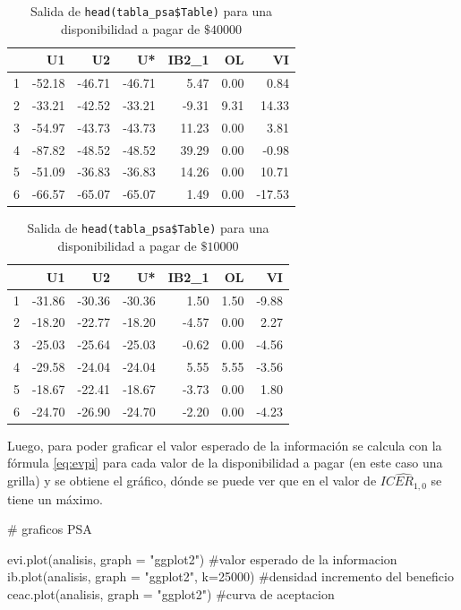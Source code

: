 \documentclass[12pt]{article}
\begin{document}
\begin{table}[ht]
\centering
\begin{tabular}{rrrrrrr}
  \hline
 & U1 & U2 & U* & IB2\_1 & OL & VI \\ 
  \hline
1 & -52.18 & -46.71 & -46.71 & 5.47 & 0.00 & 0.84 \\ 
  2 & -33.21 & -42.52 & -33.21 & -9.31 & 9.31 & 14.33 \\ 
  3 & -54.97 & -43.73 & -43.73 & 11.23 & 0.00 & 3.81 \\ 
  4 & -87.82 & -48.52 & -48.52 & 39.29 & 0.00 & -0.98 \\ 
  5 & -51.09 & -36.83 & -36.83 & 14.26 & 0.00 & 10.71 \\ 
  6 & -66.57 & -65.07 & -65.07 & 1.49 & 0.00 & -17.53 \\ 
   \hline
\end{tabular}
\caption{Salida de \texttt{head(tabla\_psa\$Table)} para una disponibilidad a pagar de $\$40000$}
\end{table}

\begin{table}[ht]
\centering
\begin{tabular}{rrrrrrr}
  \hline
 & U1 & U2 & U* & IB2\_1 & OL & VI \\ 
  \hline
1 & -31.86 & -30.36 & -30.36 & 1.50 & 1.50 & -9.88 \\ 
  2 & -18.20 & -22.77 & -18.20 & -4.57 & 0.00 & 2.27 \\ 
  3 & -25.03 & -25.64 & -25.03 & -0.62 & 0.00 & -4.56 \\ 
  4 & -29.58 & -24.04 & -24.04 & 5.55 & 5.55 & -3.56 \\ 
  5 & -18.67 & -22.41 & -18.67 & -3.73 & 0.00 & 1.80 \\ 
  6 & -24.70 & -26.90 & -24.70 & -2.20 & 0.00 & -4.23 \\ 
   \hline
\end{tabular}
\caption{Salida de \texttt{head(tabla\_psa\$Table)} para una disponibilidad a pagar de $\$10000$}
\end{table}

Luego, para poder graficar el valor esperado de la información se calcula con la fórmula \ref{eq:evpi} para cada valor de la disponibilidad a pagar (en este caso una grilla) y se obtiene el gráfico, dónde se puede ver que en el valor de $\widehat{ICER_{1,0}}$ se tiene un máximo.

\begin{Rcode}
# graficos PSA

evi.plot(analisis, graph = "ggplot2")  #valor esperado de la informacion
ib.plot(analisis, graph = "ggplot2", k=25000)  #densidad incremento del beneficio
ceac.plot(analisis, graph = "ggplot2")  #curva de aceptacion
\end{Rcode}
\end{document}
